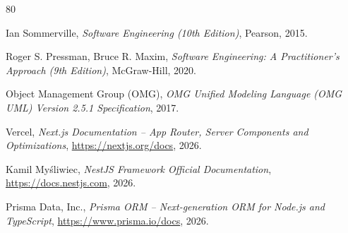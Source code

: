 \documentclass[a4paper,12pt]{article}
\begin{document}
\newpage
\begin{thebibliography}{80}

Ian Sommerville,
\textit{Software Engineering (10th Edition)},
Pearson, 2015.

Roger S. Pressman, Bruce R. Maxim,
\textit{Software Engineering: A Practitioner's Approach (9th Edition)},
McGraw-Hill, 2020.

Object Management Group (OMG),
\textit{OMG Unified Modeling Language (OMG UML) Version 2.5.1 Specification},
2017.

Vercel,
\textit{Next.js Documentation -- App Router, Server Components and Optimizations},
\url{https://nextjs.org/docs}, 2026.

Kamil Myśliwiec,
\textit{NestJS Framework Official Documentation},
\url{https://docs.nestjs.com}, 2026.

Prisma Data, Inc.,
\textit{Prisma ORM -- Next-generation ORM for Node.js and TypeScript},
\url{https://www.prisma.io/docs}, 2026.

\end{thebibliography}
\end{document}
